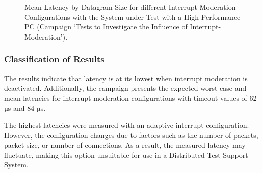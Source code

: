 \begin{figure}[h!]
  \centering
  \caption{Mean Latency by Datagram Size for different Interrupt Moderation Configurations with the System under Test with a High-Performance PC (Campaign `Tests to Investigate the Influence of Interrupt-Moderation').}
  \label{fig:IMean}
\end{figure}

\subsubsection{Classification of Results}
The results indicate that latency is at its lowest when interrupt moderation is deactivated. Additionally, the campaign presents the expected worst-case and mean latencies for interrupt moderation configurations with timeout values of 62 µs and 84 µs.

The highest latencies were measured with an adaptive interrupt configuration. However, the configuration changes due to factors such as the number of packets, packet size, or number of connections. As a result, the measured latency may fluctuate, making this option unsuitable for use in a Distributed Test Support System.


